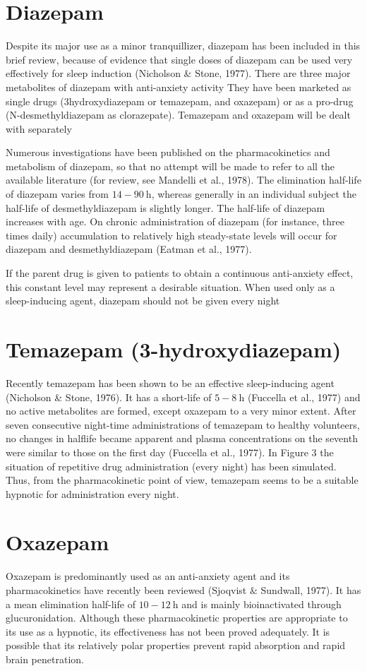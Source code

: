\documentclass[10pt]{article}
\begin{document}
\section*{Diazepam}
Despite its major use as a minor tranquillizer, diazepam has been included in this brief review, because of evidence that single doses of diazepam can be used very effectively for sleep induction (Nicholson \& Stone, 1977). There are three major metabolites of diazepam with anti-anxiety activity They have been marketed as single drugs (3hydroxydiazepam or temazepam, and oxazepam) or as a pro-drug (N-desmethyldiazepam as clorazepate). Temazepam and oxazepam will be dealt with separately

Numerous investigations have been published on the pharmacokinetics and metabolism of diazepam, so that no attempt will be made to refer to all the available literature (for review, see Mandelli et al., 1978). The elimination half-life of diazepam varies from $14-90 \mathrm{~h}$, whereas generally in an individual subject the half-life of desmethyldiazepam is slightly longer. The half-life of diazepam increases with age. On chronic administration of diazepam (for instance, three times daily) accumulation to relatively high steady-state levels will occur for diazepam and desmethyldiazepam (Eatman et al., 1977).

If the parent drug is given to patients to obtain a continuous anti-anxiety effect, this constant level may represent a desirable situation. When used only as a sleep-inducing agent, diazepam should not be given every night

\section*{Temazepam (3-hydroxydiazepam)}
Recently temazepam has been shown to be an effective sleep-inducing agent (Nicholson \& Stone, 1976). It has a short-life of $5-8 \mathrm{~h}$ (Fuccella et al., 1977) and no active metabolites are formed, except oxazepam to a very minor extent. After seven consecutive night-time administrations of temazepam to healthy volunteers, no changes in halflife became apparent and plasma concentrations on the seventh were similar to those on the first day (Fuccella et al., 1977). In Figure 3 the situation of repetitive drug administration (every night) has been simulated. Thus, from the pharmacokinetic point of view, temazepam seems to be a suitable hypnotic for administration every night.

\section*{Oxazepam}
Oxazepam is predominantly used as an anti-anxiety agent and its pharmacokinetics have recently been reviewed (Sjoqvist $\&$ Sundwall, 1977). It has a mean elimination half-life of $10-12 \mathrm{~h}$ and is mainly bioinactivated through glucuronidation. Although these pharmacokinetic properties are appropriate to its use as a hypnotic, its effectiveness has not been proved adequately. It is possible that its relatively polar properties prevent rapid absorption and rapid brain penetration.
\end{document}
